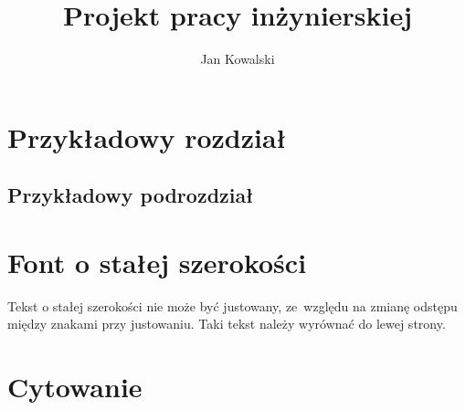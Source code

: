 \documentclass[]{wsbthesis}
\author{Jan Kowalski}
\title{Projekt pracy inżynierskiej}
\begin{document}

\maketitle{}
\printtableofcontent{}

\setcounter{page}{1}

\chapter{Przykładowy rozdział}
\section{Przykładowy podrozdział}

\chapter{Font o stałej szerokości}
Tekst o stałej szerokości nie może być justowany, ze~względu na zmianę odstępu
między znakami przy justowaniu. Taki tekst należy wyrównać do lewej strony.
\begin{flushleft}
    \ttfamily{} %
\end{flushleft}

\chapter{Cytowanie}
\end{document}
